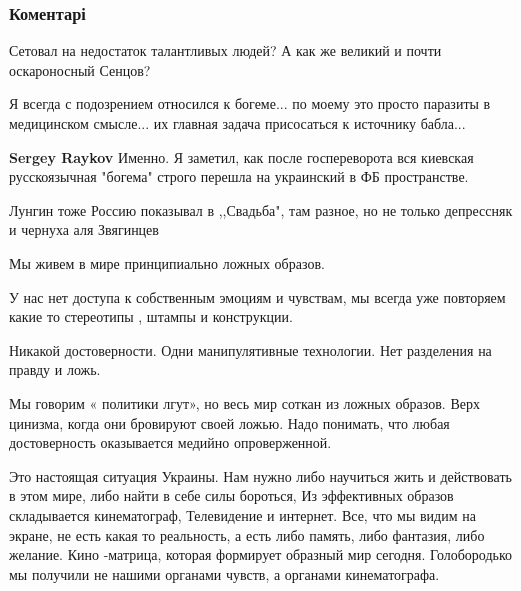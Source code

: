  
 
 
 
 
\subsubsection{Коментарі}

\begin{itemize} %
Сетовал на недостаток талантливых людей? А как же великий и почти оскароносный Сенцов?


Я всегда с подозрением относился к богеме... по моему это просто паразиты в
медицинском смысле... их главная задача присосаться к источнику бабла...

\begin{itemize} %
\textbf{Sergey Raykov} Именно. Я заметил, как после госпереворота вся киевская русскоязычная "богема" строго перешла на украинский в ФБ пространстве.
\end{itemize} %


Лунгин тоже Россию показывал в ,,Свадьба", там разное, но не только депрессняк и чернуха аля Звягинцев


Мы живем в мире принципиально ложных образов.

У нас нет доступа к собственным эмоциям и чувствам, мы всегда уже повторяем
какие то стереотипы , штампы и конструкции.

Никакой достоверности. Одни манипулятивные технологии. Нет разделения на правду
и ложь.

Мы говорим « политики лгут», но весь мир соткан из ложных образов. Верх
цинизма, когда они бровируют своей ложью. Надо понимать, что любая
достоверность оказывается медийно опроверженной.

Это настоящая ситуация Украины. Нам нужно либо научиться жить и действовать в
этом мире, либо найти в себе силы бороться, Из эффективных образов складывается
кинематограф, Телевидение и интернет. Все, что мы видим на экране, не есть
какая то реальность, а есть либо память, либо фантазия, либо желание. Кино
-матрица, которая формирует образный мир сегодня. Голобородько
мы получили не нашими органами чувств, а органами кинематографа.


\end{itemize}
